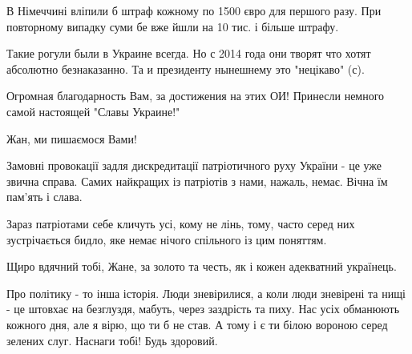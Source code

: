 \begin{itemize}
 

В Німеччині вліпили б штраф кожному по 1500 євро для першого разу. При
повторному випадку суми бе вже йшли на 10 тис. і більше штрафу.


 

Такие рогули были в Украине всегда. Но с 2014 года они творят что хотят
абсолютно безнаказанно. Та и президенту нынешнему это "нецікаво" (с).

Огромная благодарность Вам, за достижения на этих ОИ! Принесли немного самой
настоящей "Славы Украине!"

 

Жан, ми пишаємося Вами!

 

Замовні провокації задля дискредитації патріотичного руху України - це уже
звична справа. Самих найкращих із патріотів з нами, нажаль, немає. Вічна їм
пам'ять і слава.

Зараз патріотами себе кличуть усі, кому не лінь, тому, часто серед них
зустрічається бидло, яке немає нічого спільного із цим поняттям.

Щиро вдячний тобі, Жане, за золото та честь, як і кожен адекватний українець.

Про політику - то інша історія. Люди зневірилися, а коли люди зневірені та нищі
- це штовхає на безглуздя, мабуть, через заздрість та пиху. Нас усіх обманюють
кожного дня, але я вірю, що ти б не став. А тому і є ти білою вороною серед
зелених слуг. Наснаги тобі! Будь здоровий.



\end{itemize}
